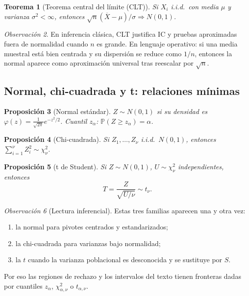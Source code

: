 \documentclass[11pt]{article}
\theoremstyle{plain}
\newtheorem{theorem}{Teorema}[section]
\newtheorem{proposition}[theorem]{Proposición}
\theoremstyle{definition}
\theoremstyle{remark}
\newtheorem{remark}[theorem]{Observación}
\theoremstyle{solstyle}
\newcommand{\Pbb}{\mathbb{P}}
\newcommand{\1}{\mathbbm{1}}
\newcommand{\Xbar}{\overline{X}}
\begin{document}
\begin{theorem}[Teorema central del límite (CLT)]
Si $X_i$ i.i.d.\ con media $\mu$ y varianza $\sigma^2<\infty$, entonces
$\sqrt{n}(\Xbar-\mu)/\sigma\Rightarrow N(0,1)$.
\end{theorem}

\begin{remark}
En inferencia clásica, CLT justifica IC y pruebas aproximadas fuera de normalidad cuando $n$ es grande.
En lenguaje operativo: si una media muestral está bien centrada y su dispersión se reduce como $1/n$,
entonces la normal aparece como aproximación universal tras reescalar por $\sqrt{n}$.
\end{remark}

\subsection{Normal, chi-cuadrada y t: relaciones mínimas}\label{app:prereq-dist}

\begin{proposition}[Normal estándar]
$Z\sim N(0,1)$ si su densidad es $\varphi(z)=\frac{1}{\sqrt{2\pi}}e^{-z^2/2}$.
Cuantil $z_{\alpha}$: $\Pbb(Z\ge z_\alpha)=\alpha$.
\end{proposition}

\begin{proposition}[Chi-cuadrada]
Si $Z_1,\dots,Z_\nu$ i.i.d.\ $N(0,1)$, entonces $\sum_{i=1}^\nu Z_i^2\sim \chi^2_\nu$.
\end{proposition}

\begin{proposition}[t de Student]
Si $Z\sim N(0,1)$, $U\sim \chi^2_\nu$ independientes, entonces
\[
T=\frac{Z}{\sqrt{U/\nu}}\sim t_\nu.
\]
\end{proposition}

\begin{remark}[Lectura inferencial]
Estas tres familias aparecen una y otra vez:
\begin{enumerate}[label=\textbf{(\arabic*)},leftmargin=2.2em]
\item la normal para pivotes centrados y estandarizados;
\item la chi-cuadrada para varianzas bajo normalidad;
\item la $t$ cuando la varianza poblacional es desconocida y se sustituye por $S$.
\end{enumerate}
Por eso las regiones de rechazo y los intervalos del texto tienen fronteras dadas por cuantiles
$z_\alpha$, $\chi^2_{\alpha,\nu}$ o $t_{\alpha,\nu}$.
\end{remark}
\end{document}
